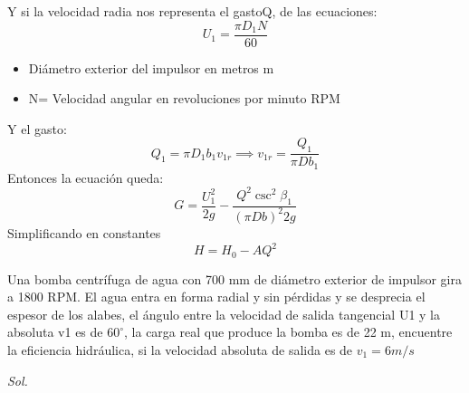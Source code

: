 Y si la velocidad radia nos representa el gastoQ, de las ecuaciones:
\begin{equation}
    U_1 = \frac{\pi D_1 N}{60}
\end{equation}
\begin{notation}
    \begin{itemize}
        \item Diámetro exterior del impulsor en metros m
        \item N= Velocidad angular en revoluciones por minuto RPM
    \end{itemize}
\end{notation}
Y el gasto:
\begin{equation}
    Q_1 = \pi D_1 b_1 v_{1r} \implies v_{1r} = \frac{Q_1}{\pi D b_1 }
\end{equation}
 Entonces la ecuación queda:
 \begin{equation}
    G = \frac{U_1^2}{2g} - \frac{Q^2 \csc^2{\beta_1} }{\left(\pi D b \right)^2 2g}
 \end{equation}
Simplificando en constantes
\begin{equation}
    H = H_0 - AQ^2
\end{equation}
\begin{example}
    Una bomba centrífuga de agua con 700 mm de diámetro exterior de impulsor gira a 1800 RPM. El agua entra en forma radial y sin pérdidas y se desprecia el espesor de los alabes, el ángulo entre la velocidad de salida tangencial U1 y la absoluta v1 es de $60^{\circ}$, la carga real que produce la bomba es de 22 m, encuentre la eficiencia hidráulica, si la velocidad absoluta de salida es de $v_1 = 6 m/s$
\end{example}
\textit{ Sol. }

